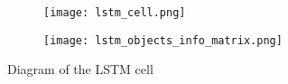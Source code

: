 \begin{figure}[H]
    \centering
    \begin{subfigure}{.5\textwidth}
        \centering
        \texttt{[image: lstm\_cell.png]}
        \label{tab:lstm_cell}
    \end{subfigure}%
    \centering
    \begin{subfigure}{.5\textwidth}
        \centering
        \texttt{[image: lstm\_objects\_info\_matrix.png]}
        \label{tab:lstm_cell_info}
    \end{subfigure}
    \caption{Diagram of the LSTM cell}
\end{figure}
